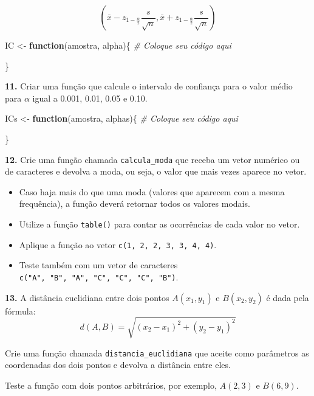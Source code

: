 \documentclass[
]{book}
\newenvironment{Shaded}{\begin{snugshade}}{\end{snugshade}}
\newcommand{\CommentTok}[1]{\textcolor[rgb]{0.56,0.35,0.01}{\textit{#1}}}
\newcommand{\ControlFlowTok}[1]{\textcolor[rgb]{0.13,0.29,0.53}{\textbf{#1}}}
\newcommand{\NormalTok}[1]{#1}
\newcommand{\OtherTok}[1]{\textcolor[rgb]{0.56,0.35,0.01}{#1}}
\begin{document}
\[\left(\bar{x}-z_{1-\frac{\alpha}{2}}\frac{s}{\sqrt{n}},\bar{x}+z_{1-\frac{\alpha}{2}}\frac{s}{\sqrt{n}}  \right)\]

\begin{Shaded}
\begin{Highlighting}[]
\NormalTok{IC }\OtherTok{\textless{}{-}} \ControlFlowTok{function}\NormalTok{(amostra, alpha)\{}
  \CommentTok{\# Coloque seu código aqui}
  
\NormalTok{\}}
\end{Highlighting}
\end{Shaded}

\textbf{11.} Criar uma função que calcule o intervalo de confiança para o valor médio para \(\alpha\) igual a 0.001, 0.01, 0.05 e 0.10.

\begin{Shaded}
\begin{Highlighting}[]
\NormalTok{ICs }\OtherTok{\textless{}{-}} \ControlFlowTok{function}\NormalTok{(amostra, alphas)\{}
  \CommentTok{\# Coloque seu código aqui}
  
\NormalTok{\}}
\end{Highlighting}
\end{Shaded}

\textbf{12.} Crie uma função chamada \texttt{calcula\_moda} que receba um vetor numérico ou de caracteres e devolva a moda, ou seja, o valor que mais vezes aparece no vetor.

\begin{itemize}
\item
  Caso haja mais do que uma moda (valores que aparecem com a mesma frequência), a função deverá retornar todos os valores modais.
\item
  Utilize a função \texttt{table()} para contar as ocorrências de cada valor no vetor.
\item
  Aplique a função ao vetor \texttt{c(1,\ 2,\ 2,\ 3,\ 3,\ 4,\ 4)}.
\item
  Teste também com um vetor de caracteres \texttt{c("A",\ "B",\ "A",\ "C",\ "C",\ "C",\ "B")}.
\end{itemize}

\textbf{13.} A distância euclidiana entre dois pontos \(A(x_1, y_1)\) e \(B(x_2, y_2)\) é dada pela fórmula:
\[d(A, B) = \sqrt{(x_2 - x_1)^2 + (y_2 - y_1)^2}\]

Crie uma função chamada \texttt{distancia\_euclidiana} que aceite como parâmetros as coordenadas dos dois pontos e devolva a distância entre eles.

Teste a função com dois pontos arbitrários, por exemplo, \(A(2, 3)\) e \(B(6, 9)\).
\end{document}
